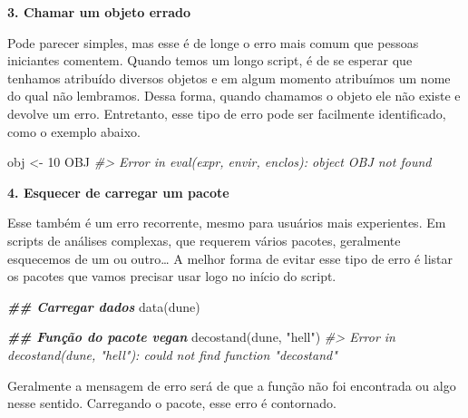 \documentclass[
]{book}
\newenvironment{Shaded}{\begin{snugshade}}{\end{snugshade}}
\newcommand{\CommentTok}[1]{\textcolor[rgb]{0.37,0.37,0.37}{\textit{#1}}}
\newcommand{\DecValTok}[1]{\textcolor[rgb]{0.06,0.06,0.06}{#1}}
\newcommand{\DocumentationTok}[1]{\textcolor[rgb]{0.37,0.37,0.37}{\textbf{\textit{#1}}}}
\newcommand{\FunctionTok}[1]{\textcolor[rgb]{0,0,0}{#1}}
\newcommand{\NormalTok}[1]{#1}
\newcommand{\OtherTok}[1]{\textcolor[rgb]{0.37,0.37,0.37}{#1}}
\newcommand{\StringTok}[1]{\textcolor[rgb]{0.5,0.5,0.5}{#1}}
\begin{document}
\textbf{3. Chamar um objeto errado}

Pode parecer simples, mas esse é de longe o erro mais comum que pessoas iniciantes comentem. Quando temos um longo script, é de se esperar que tenhamos atribuído diversos objetos e em algum momento atribuímos um nome do qual não lembramos. Dessa forma, quando chamamos o objeto ele não existe e devolve um erro. Entretanto, esse tipo de erro pode ser facilmente identificado, como o exemplo abaixo.

\begin{Shaded}
\begin{Highlighting}[]
\NormalTok{obj }\OtherTok{\textless{}{-}} \DecValTok{10}
\NormalTok{OBJ}
\CommentTok{\#\textgreater{} Error in eval(expr, envir, enclos): object \textquotesingle{}OBJ\textquotesingle{} not found}
\end{Highlighting}
\end{Shaded}

\textbf{4. Esquecer de carregar um pacote}

Esse também é um erro recorrente, mesmo para usuários mais experientes. Em scripts de análises complexas, que requerem vários pacotes, geralmente esquecemos de um ou outro\ldots{} A melhor forma de evitar esse tipo de erro é listar os pacotes que vamos precisar usar logo no início do script.

\begin{Shaded}
\begin{Highlighting}[]
\DocumentationTok{\#\# Carregar dados}
\FunctionTok{data}\NormalTok{(dune)}

\DocumentationTok{\#\# Função do pacote vegan}
\FunctionTok{decostand}\NormalTok{(dune, }\StringTok{"hell"}\NormalTok{)}
\CommentTok{\#\textgreater{} Error in decostand(dune, "hell"): could not find function "decostand"}
\end{Highlighting}
\end{Shaded}

Geralmente a mensagem de erro será de que a função não foi encontrada ou algo nesse sentido. Carregando o pacote, esse erro é contornado.
\end{document}
